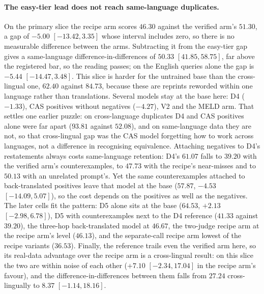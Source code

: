\paragraph{The easy-tier lead does not reach same-language duplicates.}
On the primary slice the recipe arm scores $46.30$ against the verified arm's $51.30$, a gap of $-5.00$ $[-13.42, 3.35]$ whose interval includes zero, so there is no measurable difference between the arms. Subtracting it from the easy-tier gap gives a same-language difference-in-differences of $50.33$ $[41.85, 58.75]$, far above the registered bar, so the reading passes; on the English queries alone the gap is $-5.44$ $[-14.47, 3.48]$. This slice is harder for the untrained base than the cross-lingual one, $62.40$ against $84.73$, because these are reprints reworded within one language rather than translations. Several models stay at the base here: D4 ($-1.33$), CAS positives without negatives ($-4.27$), V2 and the MELD arm. That settles one earlier puzzle: on cross-language duplicates D4 and CAS positives alone were far apart ($93.81$ against $52.08$), and on same-language data they are not, so that cross-lingual gap was the CAS model forgetting how to work across languages, not a difference in recognising equivalence. Attaching negatives to D4's restatements always costs same-language retention: D4's $61.07$ falls to $39.20$ with the verified arm's counterexamples, to $47.73$ with the recipe's near-misses and to $50.13$ with an unrelated prompt's. Yet the same counterexamples attached to back-translated positives leave that model at the base ($57.87$, $-4.53$ $[-14.09, 5.07]$), so the cost depends on the positives as well as the negatives. The later cells fit the pattern: D5 alone sits at the base ($64.53$, $+2.13$ $[-2.98, 6.78]$), D5 with counterexamples next to the D4 reference ($41.33$ against $39.20$), the three-hop back-translated model at $46.67$, the two-judge recipe arm at the recipe arm's level ($46.13$), and the separate-call recipe arm lowest of the recipe variants ($36.53$). Finally, the reference trails even the verified arm here, so its real-data advantage over the recipe arm is a cross-lingual result: on this slice the two are within noise of each other ($+7.10$ $[-2.34, 17.04]$ in the recipe arm's favour), and the difference-in-differences between them falls from $27.24$ cross-lingually to $8.37$ $[-1.14, 18.16]$.

